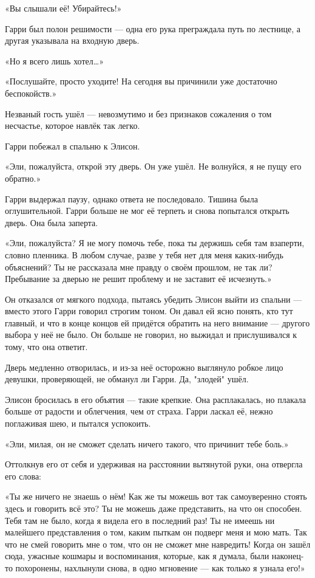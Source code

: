 \documentclass[a4paper,12pt]{book}
\begin{document}
\par
«Вы слышали её! Убирайтесь!»
\par
Гарри был полон решимости — одна его рука преграждала путь по лестнице, а другая указывала на входную дверь.
\par
«Но я всего лишь хотел…»
\par
«Послушайте, просто уходите! На сегодня вы причинили уже достаточно беспокойств.»
\par
Незваный гость ушёл — невозмутимо и без признаков сожаления о том несчастье, которое навлёк так легко.
\par
Гарри побежал в спальню к Элисон.
\par
«Эли, пожалуйста, открой эту дверь. Он уже ушёл. Не волнуйся, я не пущу его обратно.»
\par
Гарри выдержал паузу, однако ответа не последовало. Тишина была оглушительной. Гарри больше не мог её терпеть и снова попытался открыть дверь. Она была заперта.
\par
«Эли, пожалуйста? Я не могу помочь тебе, пока ты держишь себя там взаперти, словно пленника. В любом случае, разве у тебя нет для меня каких-нибудь объяснений? Ты не рассказала мне правду о своём прошлом, не так ли? Пребывание за дверью не решит проблему и не заставит её исчезнуть.»
\par
Он отказался от мягкого подхода, пытаясь убедить Элисон выйти из спальни — вместо этого Гарри говорил строгим тоном. Он давал ей ясно понять, кто тут главный, и что в конце концов ей придётся обратить на него внимание — другого выбора у неё не было. Он больше не говорил, но выжидал и прислушивался к тому, что она ответит.
\par
Дверь медленно отворилась, и из-за неё осторожно выглянуло робкое лицо девушки, проверяющей, не обманул ли Гарри. Да, "злодей" ушёл.
\par
Элисон бросилась в его объятия — такие крепкие. Она расплакалась, но плакала больше от радости и облегчения, чем от страха. Гарри ласкал её, нежно поглаживая шею, и пытался успокоить.
\par
«Эли, милая, он не сможет сделать ничего такого, что причинит тебе боль.»
\par
Оттолкнув его от себя и удерживая на расстоянии вытянутой руки, она отвергла его слова:
\par
«Ты же ничего не знаешь о нём! Как же ты можешь вот так самоуверенно стоять здесь и говорить всё это? Ты не можешь даже представить, на что он способен. Тебя там не было, когда я видела его в последний раз! Ты не имеешь ни малейшего представления о том, каким пыткам он подверг меня и мою мать. Так что не смей говорить мне о том, что он не сможет мне навредить! Когда он зашёл сюда, ужасные кошмары и воспоминания, которые, как я думала, были наконец-то похоронены, нахлынули снова, в одно мгновение — как только я узнала его!»
\end{document}
